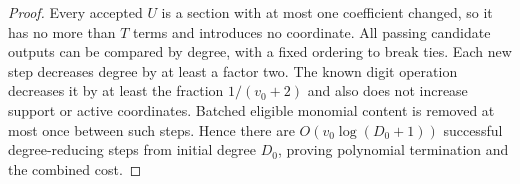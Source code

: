 \begin{proof}
Every accepted $U$ is a section with at most one coefficient changed,
so it has no more than $T$ terms and introduces no coordinate.
All passing candidate outputs can be compared by degree, with a
fixed ordering to break ties. Each new step decreases degree by
at least a factor two. The known digit operation decreases it by
at least the fraction $1/(v_0+2)$ and also does not increase
support or active coordinates. Batched eligible monomial content
is removed at most once between such steps. Hence there are
$O(v_0\log(D_0+1))$ successful degree-reducing steps from initial
degree $D_0$, proving polynomial termination and the combined cost.
\end{proof}
